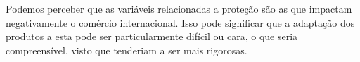 \documentclass[12pt, a4paper]{article}
\begin{document}
Podemos perceber que as variáveis relacionadas a proteção são as que impactam negativamente o comércio internacional. Isso pode significar que a adaptação dos produtos a esta pode ser particularmente difícil ou cara, o que seria compreensível, visto que tenderiam a ser mais rigorosas.




% 


\printbibliography
\end{document}
